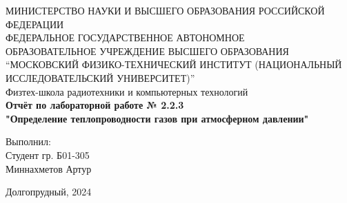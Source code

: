 \begin{center}
МИНИСТЕРСТВО НАУКИ И ВЫСШЕГО ОБРАЗОВАНИЯ РОССИЙСКОЙ ФЕДЕРАЦИИ\\
\hfill \break
ФЕДЕРАЛЬНОЕ ГОСУДАРСТВЕННОЕ АВТОНОМНОЕ \\ ОБРАЗОВАТЕЛЬНОЕ УЧРЕЖДЕНИЕ ВЫСШЕГО ОБРАЗОВАНИЯ \\
“МОСКОВСКИЙ ФИЗИКО-ТЕХНИЧЕСКИЙ ИНСТИТУТ (НАЦИОНАЛЬНЫЙ ИССЛЕДОВАТЕЛЬСКИЙ УНИВЕРСИТЕТ)” \\

\hfill \break
Физтех-школа радиотехники и компьютерных технологий\\
\vspace{2.5cm}
\large{\textbf{Отчёт по лабораторной работе № 2.2.3}}\\
\large{\textbf{"Определение теплопроводности газов при атмосферном давлении"}}\\
\hfill \break
\end{center}

\vspace{5cm}

\begin{flushright}
Выполнил:\\
Студент гр. Б01-305\\
Миннахметов Артур\\
\end{flushright}

\vfill


\begin{center} Долгопрудный, 2024 \end{center}

\thispagestyle{empty}
\newpage
